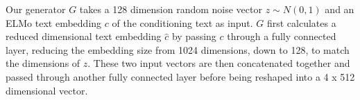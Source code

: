 Our generator $G$ takes a 128 dimension random noise vector $z \sim N(0, 1)$ and an ELMo text embedding $c$ of the conditioning text as input. $G$ first calculates a reduced dimensional text embedding $\hat{c}$ by passing $c$ through a fully connected layer, reducing the embedding size from 1024 dimensions, down to 128, to match the dimensions of $z$. These two input vectors are then concatenated together and passed through another fully connected layer before being reshaped into a 4 x 512 dimensional vector.